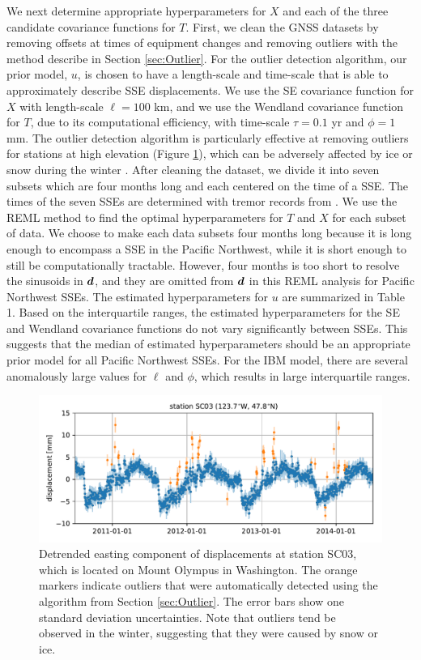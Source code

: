 \documentclass[extra,mreferee]{gji}
\begin{document}
We next determine appropriate hyperparameters for $X$ and each of the
three candidate covariance functions for $T$. First, we clean the GNSS
datasets by removing offsets at times of equipment changes and
removing outliers with the method describe in Section
\ref{sec:Outlier}. For the outlier detection algorithm, our prior
model, $u$, is chosen to have a length-scale and time-scale that is
able to approximately describe SSE displacements. We use the SE
covariance function for $X$ with length-scale $\ell = 100$ km, and we
use the Wendland covariance function for $T$, due to its computational
efficiency, with time-scale $\tau = 0.1$ yr and $\phi = 1$ mm.  The
outlier detection algorithm is particularly effective at removing
outliers for stations at high elevation (Figure \ref{fig:Outliers}),
which can be adversely affected by ice or snow during the winter
\citep{Lisowski2008}. After cleaning the dataset, we divide it into
seven subsets which are four months long and each centered on the time
of a SSE. The times of the seven SSEs are determined with tremor
records from \cite{Wech2010}. We use the REML method to find the
optimal hyperparameters for $T$ and $X$ for each subset of data. We
choose to make each data subsets four months long because it is long
enough to encompass a SSE in the Pacific Northwest, while it is short
enough to still be computationally tractable. However, four months is
too short to resolve the sinusoids in $\data$, and they are omitted
from $\data$ in this REML analysis for Pacific Northwest SSEs. The
estimated hyperparameters for $u$ are summarized in Table 1. Based on
the interquartile ranges, the estimated hyperparameters for the SE and
Wendland covariance functions do not vary significantly between SSEs.
This suggests that the median of estimated hyperparameters should be
an appropriate prior model for all Pacific Northwest SSEs. For the IBM
model, there are several anomalously large values for $\ell$ and
$\phi$, which results in large interquartile ranges.

\begin{figure}
\includegraphics{figures/outliers/outliers.pdf}
\caption{
Detrended easting component of displacements at station SC03, which is
located on Mount Olympus in Washington. The orange markers indicate
outliers that were automatically detected using the algorithm from
Section \ref{sec:Outlier}. The error bars show one standard deviation
uncertainties. Note that outliers tend be observed in the winter,
suggesting that they were caused by snow or ice.
}   
\label{fig:Outliers}
\end{figure}
\end{document}
